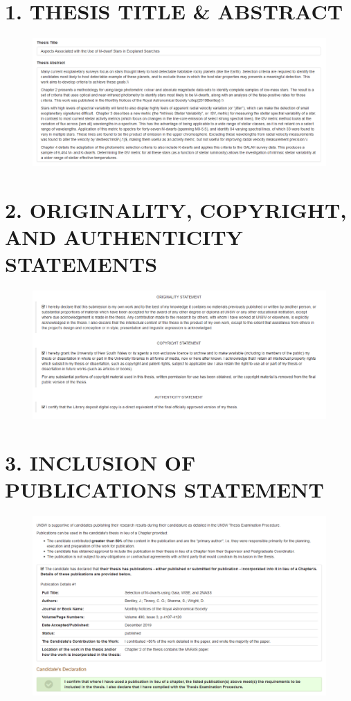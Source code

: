 \section*{1. THESIS TITLE \& ABSTRACT}
\begin{figure}[H]
    \hspace{-3cm}
    \includegraphics[width=1.3\textwidth]{Abstract.png}
\end{figure}

\section*{2. ORIGINALITY, COPYRIGHT, AND AUTHENTICITY STATEMENTS}
\begin{figure}[H]
    \hspace{-3cm}
    \includegraphics[width=1.3\textwidth]{Origniality.png}
\end{figure}

\section*{3. INCLUSION OF PUBLICATIONS STATEMENT}
\begin{figure}[H]
    \hspace{-2cm}
    \includegraphics[width=1.4\textwidth]{Publications.png}
\end{figure}